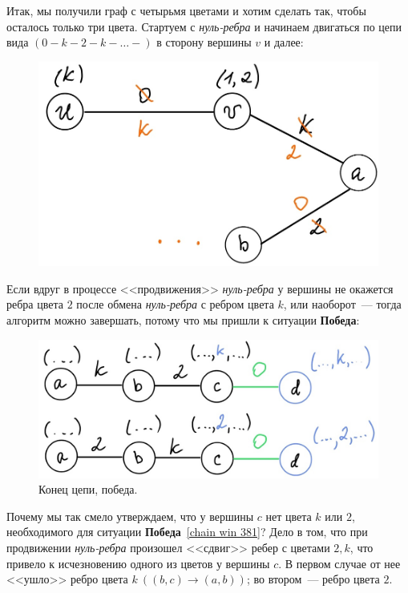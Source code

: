 Итак, мы получили граф с четырьмя цветами и хотим сделать так, чтобы осталось только три цвета. Стартуем с \emph{нуль-ребра} и начинаем двигаться по цепи вида \((0-k-2-k-\ldots-)\) в сторону вершины \(v\) и далее:
\begin{figure}[H]
    \centering
    \includegraphics[scale=0.2]{Fall/img/solution-381_chain_begin.jpg}
\end{figure}

Если вдруг в процессе <<продвижения>> \emph{нуль-ребра} у вершины не окажется ребра цвета \(2\) после обмена \emph{ нуль-ребра} с ребром цвета \(k\), или наоборот~--- тогда алгоритм можно завершать, потому что мы пришли к ситуации \textbf{Победа}:
\begin{figure}[H]
    \centering
    \includegraphics[scale=0.3]{Fall/img/solution-381_chain_end.jpg}
    \caption{Конец цепи, победа.} \label{chain win 381}
\end{figure}

Почему мы так смело утверждаем, что у вершины \(c\) нет цвета \(k\) или \(2\), необходимого для ситуации \textbf{Победа}~\eqref{chain win 381}? Дело в том, что при продвижении \emph{нуль-ребра} произошел <<сдвиг>> ребер с цветами \(2, k\), что привело к исчезновению одного из цветов у вершины \(c\). В первом случае от нее <<ушло>> ребро цвета \(k\:((b, c) \rightarrow (a, b))\); во втором~--- ребро цвета \(2\).

